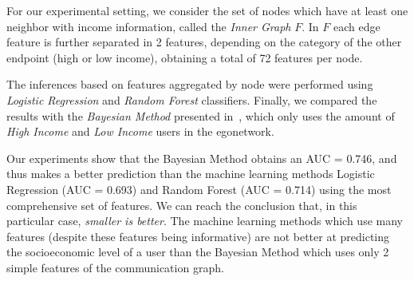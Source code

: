 \documentclass[conference,onecolumn]{IEEEtran}
\begin{document}
For our experimental setting, we consider the set of nodes which have at least one neighbor with income information, called the \emph{Inner Graph} $F$.
In $F$ each edge feature is further separated in 2 features, depending on the category of the other endpoint (high or low income), obtaining a total of 72 features per node.

The inferences based on features aggregated by node were performed using \emph{Logistic Regression} and \emph{Random Forest} classifiers.
Finally, we compared the results with the \emph{Bayesian Method} presented in~\cite{fixmanasonam2016}, which only uses the amount of \emph{High Income} and \emph{Low Income} users in the egonetwork. 

Our experiments show that the Bayesian Method obtains an AUC = 0.746, and thus makes a better prediction than the machine learning methods Logistic Regression (AUC = 0.693) and Random Forest (AUC = 0.714) using the most comprehensive set of features. 
We can reach the conclusion that, in this particular case, \emph{smaller is better}. The {machine learning} methods which use many features (despite these features being informative) are not better at predicting the socioeconomic level of a user than the Bayesian Method which uses only 2 simple features of the communication graph.


{}
\end{document}
